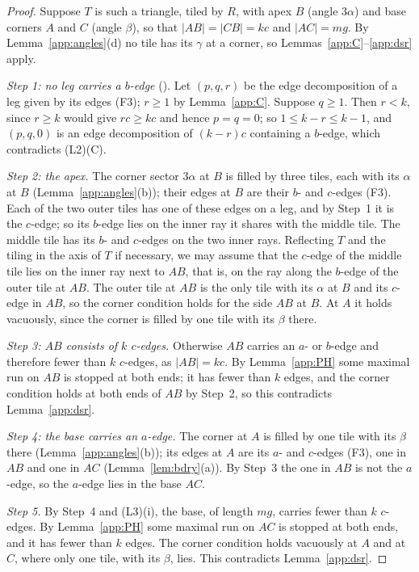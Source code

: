\documentclass[11pt]{amsart}
\theoremstyle{remark}
\begin{document}
\begin{proof}
Suppose $T$ is such a triangle, tiled by $R$, with apex $B$ (angle $3\alpha$) and base corners $A$ and $C$ (angle $\beta$), so that $|AB|=|CB|=kc$ and $|AC|=mg$. By Lemma~\ref{app:angles}(d) no tile has its $\gamma$ at a corner, so Lemmas~\ref{app:C}--\ref{app:dsr} apply.

\emph{Step 1: no leg carries a $b$-edge} \textup{(}\cite[Lemma~36]{BR}\textup{)}. Let $(p,q,r)$ be the edge decomposition of a leg given by its edges (F3); $r\ge1$ by Lemma~\ref{app:C}. Suppose $q\ge1$. Then $r<k$, since $r\ge k$ would give $rc\ge kc$ and hence $p=q=0$; so $1\le k-r\le k-1$, and $(p,q,0)$ is an edge decomposition of $(k-r)c$ containing a $b$-edge, which contradicts (L2)(C).

\emph{Step 2: the apex.} The corner sector $3\alpha$ at $B$ is filled by three tiles, each with its $\alpha$ at $B$ (Lemma~\ref{app:angles}(b)); their edges at $B$ are their $b$- and $c$-edges (F3). Each of the two outer tiles has one of these edges on a leg, and by Step~1 it is the $c$-edge; so its $b$-edge lies on the inner ray it shares with the middle tile. The middle tile has its $b$- and $c$-edges on the two inner rays. Reflecting $T$ and the tiling in the axis of $T$ if necessary, we may assume that the $c$-edge of the middle tile lies on the inner ray next to $AB$, that is, on the ray along the $b$-edge of the outer tile at $AB$. The outer tile at $AB$ is the only tile with its $\alpha$ at $B$ and its $c$-edge in $AB$, so the corner condition holds for the side $AB$ at $B$. At $A$ it holds vacuously, since the corner is filled by one tile with its $\beta$ there.

\emph{Step 3: $AB$ consists of $k$ $c$-edges.} Otherwise $AB$ carries an $a$- or $b$-edge and therefore fewer than $k$ $c$-edges, as $|AB|=kc$. By Lemma~\ref{app:PH} some maximal run on $AB$ is stopped at both ends; it has fewer than $k$ edges, and the corner condition holds at both ends of $AB$ by Step~2, so this contradicts Lemma~\ref{app:dsr}.

\emph{Step 4: the base carries an $a$-edge.} The corner at $A$ is filled by one tile with its $\beta$ there (Lemma~\ref{app:angles}(b)); its edges at $A$ are its $a$- and $c$-edges (F3), one in $AB$ and one in $AC$ (Lemma~\ref{lem:bdry}(a)). By Step~3 the one in $AB$ is not the $a$-edge, so the $a$-edge lies in the base $AC$.

\emph{Step 5.} By Step~4 and (L3)(i), the base, of length $mg$, carries fewer than $k$ $c$-edges. By Lemma~\ref{app:PH} some maximal run on $AC$ is stopped at both ends, and it has fewer than $k$ edges. The corner condition holds vacuously at $A$ and at $C$, where only one tile, with its $\beta$, lies. This contradicts Lemma~\ref{app:dsr}.
\end{proof}
\end{document}
